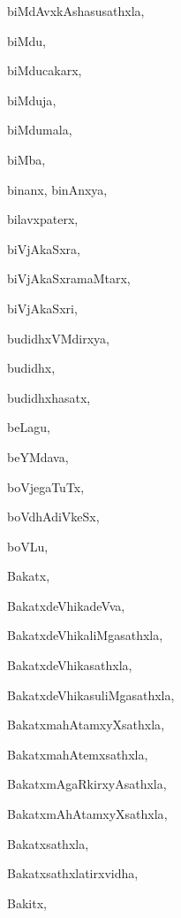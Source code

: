 \begin{multicols}{2}
{biMdAvxkAshasusathxla}, \pageref{biMdAvxkAshasusathxla}

{biMdu}, \pageref{biMdu}

{biMducakarx}, \pageref{biMducakarx}

{biMduja}, \pageref{biMduja}

{biMdumala}, \pageref{biMdumala}

{biMba}, \pageref{biMba}

{binanx, binAnxya}, \pageref{binanx, binAnxya}

{bilavxpaterx}, \pageref{bilavxpaterx}

{biVjAkaSxra}, \pageref{biVjAkaSxra}

{biVjAkaSxramaMtarx}, \pageref{biVjAkaSxramaMtarx}

{biVjAkaSxri}, \pageref{biVjAkaSxri}

{budidhxVMdirxya}, \pageref{budidhxVMdirxya}

{budidhx}, \pageref{budidhx}

{budidhxhasatx}, \pageref{budidhxhasatx}

{beLagu}, \pageref{beLagu}

{beYMdava}, \pageref{beYMdava}

{boVjegaTuTx}, \pageref{boVjegaTuTx}

{boVdhAdiVkeSx}, \pageref{boVdhAdiVkeSx}

{boVLu}, \pageref{boVLu}

{Bakatx}, \pageref{Bakatx}

{BakatxdeVhikadeVva}, \pageref{BakatxdeVhikadeVva}

{BakatxdeVhikaliMgasathxla}, \pageref{BakatxdeVhikaliMgasathxla}

{BakatxdeVhikasathxla}, \pageref{BakatxdeVhikasathxla}

{BakatxdeVhikasuliMgasathxla}, \pageref{BakatxdeVhikasuliMgasathxla}

{BakatxmahAtamxyXsathxla}, \pageref{BakatxmahAtamxyXsathxla}

{BakatxmahAtemxsathxla}, \pageref{BakatxmahAtemxsathxla}

{BakatxmAgaRkirxyAsathxla}, \pageref{BakatxmAgaRkirxyAsathxla}

{BakatxmAhAtamxyXsathxla}, \pageref{BakatxmAhAtamxyXsathxla}

{Bakatxsathxla}, \pageref{Bakatxsathxla}

{Bakatxsathxlatirxvidha}, \pageref{Bakatxsathxlatirxvidha}

{Bakitx}, \pageref{Bakitx}


\end{multicols}
